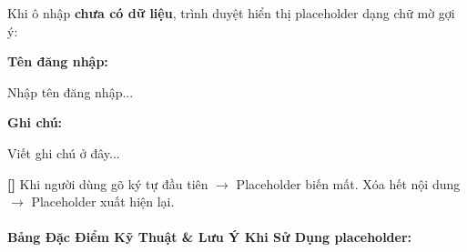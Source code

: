 \begin{browserWindow}
\sffamily\small
Khi ô nhập \textbf{chưa có dữ liệu}, trình duyệt hiển thị placeholder dạng chữ mờ gợi ý:
\begin{tcolorbox}[colback=white, colframe=gray!30, arc=4pt, boxrule=0.8pt, left=10pt, right=10pt, top=8pt, bottom=8pt]
\textbf{\sffamily\small\textcolor{darkText}{Tên đăng nhập:}}\\[3pt]
\begin{tcolorbox}[colback=white, colframe=gray!40, arc=3pt, boxrule=0.6pt, left=8pt, right=8pt, top=4pt, bottom=4pt]
\textcolor{gray!50}{\sffamily\small Nhập tên đăng nhập...}
\end{tcolorbox}
\vspace{4pt}
\textbf{\sffamily\small\textcolor{darkText}{Ghi chú:}}\\[3pt]
\begin{tcolorbox}[colback=white, colframe=gray!40, arc=3pt, boxrule=0.6pt, left=8pt, right=8pt, top=4pt, bottom=12pt]
\textcolor{gray!50}{\sffamily\small Viết ghi chú ở đây...}
\end{tcolorbox}
\end{tcolorbox}
\textcolor{primaryBlue}{\textbf{[\textrightarrow]}} Khi người dùng gõ ký tự đầu tiên $\rightarrow$ Placeholder biến mất. Xóa hết nội dung $\rightarrow$ Placeholder xuất hiện lại.
\end{browserWindow}

\paragraph{Bảng Đặc Điểm Kỹ Thuật \& Lưu Ý Khi Sử Dụng placeholder:}

